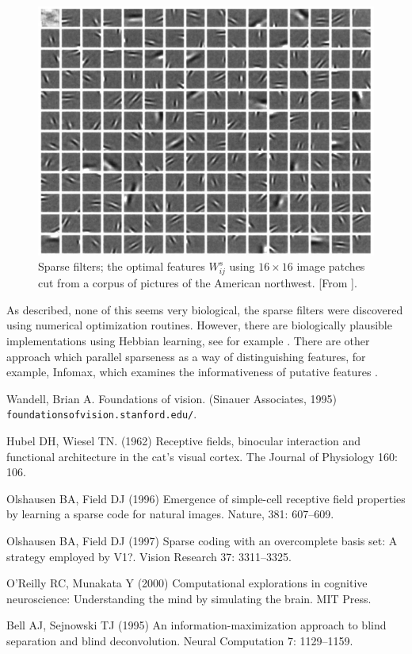 \documentclass[11pt,a4paper]{scrartcl}
\begin{document}
\begin{figure}
\begin{center}
\includegraphics[width=12cm]{edges.png}
\end{center}
\caption{Sparse filters; the optimal features $W^s_{ij}$ using
  $16\times 16$ image patches cut from a corpus of pictures of the
  American northwest. [From \cite{OlshausenField1996a}].\label{fig:edges}}
\end{figure}

As described, none of this seems very biological, the sparse filters
were discovered using numerical optimization routines. However, there
are biologically plausible implementations using Hebbian learning, see
for example \cite{OReillyMunakata2000a}. There are other approach
which parallel sparseness as a way of distinguishing features, for
example, Infomax, which examines the informativeness of putative features \cite{BellSejnowski1995a}.


\begin{thebibliography}{10}

Wandell, Brian A. Foundations of vision. 
\newblock(Sinauer Associates, 1995) \texttt{foundationsofvision.stanford.edu/}.

 Hubel DH, Wiesel TN. (1962) Receptive
  fields, binocular interaction and functional architecture in the
  cat's visual cortex.  \newblock The Journal of Physiology 160: 106.

Olshausen BA, Field DJ (1996) Emergence of simple-cell receptive field properties by learning a sparse code for natural images. 
\newblock Nature, 381: 607--609.

Olshausen BA, Field DJ (1997) Sparse coding with an overcomplete basis set: A strategy employed by V1?. 
\newblock Vision Research 37: 3311--3325.

O'Reilly RC, Munakata Y (2000) Computational explorations in cognitive neuroscience: Understanding the mind by simulating the brain. 
\newblock MIT Press.

Bell AJ, Sejnowski TJ (1995) An information-maximization approach to blind separation and blind deconvolution. 
\newblock Neural Computation 7: 1129--1159.



\end{thebibliography}
\end{document}
